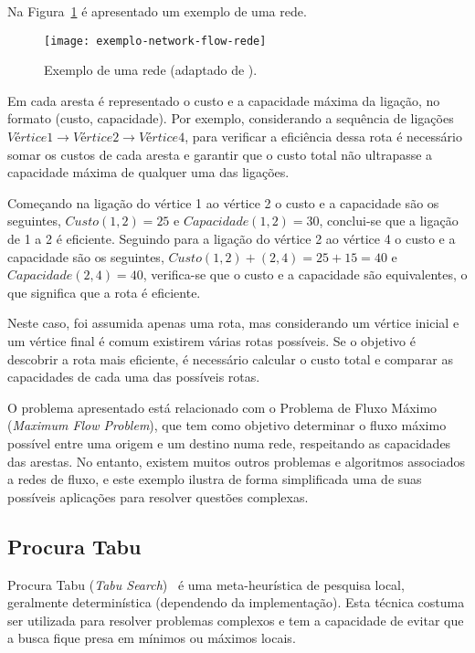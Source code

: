 Na Figura~\ref{fig:exemplo-network-flow-rede} é apresentado um exemplo de uma rede.

\begin{figure}[H]
    \centering
    \texttt{[image: exemplo-network-flow-rede]}
    \caption{Exemplo de uma rede (adaptado de \cite{Networkflows-Ahuja-1993}).}
    \label{fig:exemplo-network-flow-rede}
\end{figure}

Em cada aresta é representado o custo e a capacidade máxima da ligação, no formato (custo, capacidade). Por exemplo, considerando a sequência de ligações $Vértice 1 \rightarrow Vértice 2 \rightarrow Vértice 4$, para verificar a eficiência dessa rota é necessário somar os custos de cada aresta e garantir que o custo total não ultrapasse a capacidade máxima de qualquer uma das ligações.

Começando na ligação do vértice 1 ao vértice 2 o custo e a capacidade são os seguintes, $ Custo (1, 2) = 25 $ e $ Capacidade (1,2) = 30 $, conclui-se que a ligação de 1 a 2 é eficiente. Seguindo para a ligação do vértice 2 ao vértice 4 o custo e a capacidade são os seguintes, $ Custo (1, 2) + (2, 4) = 25 + 15 = 40 $ e $ Capacidade (2, 4) = 40 $, verifica-se que o custo e a capacidade são equivalentes, o que significa que a rota é eficiente.

Neste caso, foi assumida apenas uma rota, mas considerando um vértice inicial e um vértice final é comum existirem várias rotas possíveis. Se o objetivo é descobrir a rota mais eficiente, é necessário calcular o custo total e comparar as capacidades de cada uma das possíveis rotas.

O problema apresentado está relacionado com o Problema de Fluxo Máximo (\textit{Maximum Flow Problem}), que tem como objetivo determinar o fluxo máximo possível entre uma origem e um destino numa rede, respeitando as capacidades das arestas. No entanto, existem muitos outros problemas e algoritmos associados a redes de fluxo, e este exemplo ilustra de forma simplificada uma de suas possíveis aplicações para resolver questões complexas.

\subsection{Procura Tabu}
\label{explic:tabu-search}

Procura Tabu (\textit{Tabu Search})~\cite{MetaheuristicsDesignImplementation-Talbi-2009} é uma meta-heurística de pesquisa local, geralmente determinística (dependendo da implementação). Esta técnica costuma ser utilizada para resolver problemas complexos e tem a capacidade de evitar que a busca fique presa em mínimos ou máximos locais.


